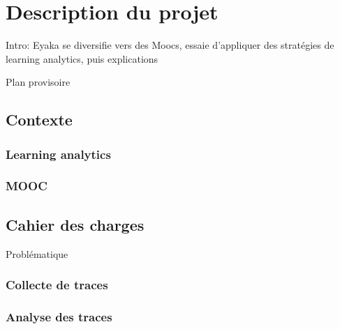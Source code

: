\chapter{Description du projet}

    Intro: Eyaka se diversifie vers des Moocs, essaie d'appliquer des stratégies de learning analytics, puis explications


    Plan provisoire

    \section{Contexte}
    \subsection{Learning analytics}
    \subsection{MOOC}
    \section{Cahier des charges}

        Problématique

        \subsection{Collecte de traces}


        \subsection{Analyse des traces}